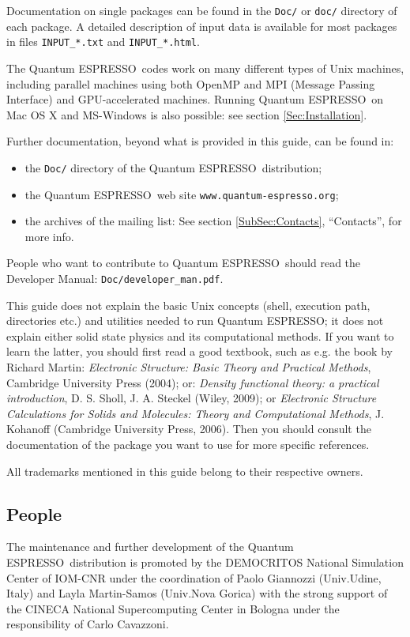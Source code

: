 \documentclass[12pt,a4paper]{article}
\def\qe{{\sc Quantum ESPRESSO}}
\begin{document}
Documentation on single packages can be found in the \texttt{Doc/} or
\texttt{doc/} directory of each package. A detailed description of input
data is available for most packages in files \texttt{INPUT\_*.txt} and 
\texttt{INPUT\_*.html}.

The \qe\ codes work on many different types of Unix machines,
including parallel machines using both OpenMP and MPI 
(Message Passing Interface) and GPU-accelerated machines.
Running \qe\ on Mac OS X and MS-Windows is also possible: 
see section \ref{Sec:Installation}.

Further documentation, beyond what is provided in this guide, can be found in:
\begin{itemize}
  \item the \texttt{Doc/} directory of the \qe\ distribution;
  \item the \qe\ web site \texttt{www.quantum-espresso.org};
  \item the archives of the  mailing list:
   See section \ref{SubSec:Contacts}, ``Contacts'', for more info.
\end{itemize}
People who want to contribute to \qe\ should read the 
Developer Manual: \texttt{Doc/developer\_man.pdf}.

This guide does not explain the basic Unix concepts (shell, execution 
path, directories etc.) and utilities needed to run \qe; it does not 
explain either solid state physics and its computational methods.
If you want to learn the latter, you should first read a good textbook, 
such as e.g. the book by Richard Martin:
{\em Electronic Structure: Basic Theory and Practical Methods},
Cambridge University Press (2004); or:
{\em Density functional theory: a practical introduction}, 
D. S. Sholl, J. A. Steckel (Wiley, 2009); or
{\em Electronic Structure Calculations for Solids and Molecules:
Theory and Computational Methods}, 
J. Kohanoff (Cambridge University Press, 2006). Then you should consult
the documentation of the package you want to use for more specific references.

All trademarks mentioned in this guide belong to their respective owners.

\subsection{People}

The maintenance and further development of the \qe\ distribution
is promoted by the DEMOCRITOS National Simulation Center 
of IOM-CNR under the coordination of
Paolo Giannozzi (Univ.Udine, Italy) and Layla Martin-Samos 
(Univ.Nova Gorica) with the strong support
of the CINECA National Supercomputing Center in Bologna under 
the responsibility of Carlo Cavazzoni.
\end{document}
